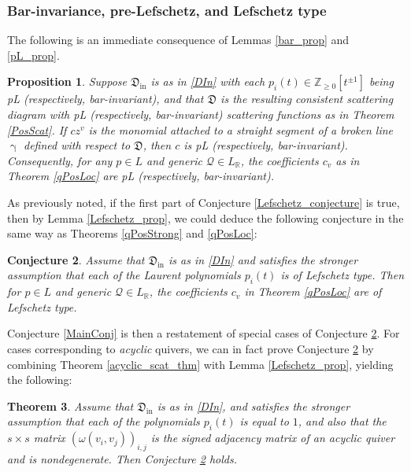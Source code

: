 \documentclass{amsart}
\DeclareMathOperator{\In}{in}
\let\bb=\mathbb
\let\f=\mathfrak
\newcommand {\sQ} {\mathcal{Q}}
\renewcommand{\gamma}{\upgamma}
\theoremstyle{plain}%
\newtheorem{thm}{Theorem}[section]
\newtheorem{prop}[thm]{Proposition}
\newtheorem{conj}[thm]{Conjecture}
\theoremstyle{definition}
\theoremstyle{remark}
\begin{document}
\subsubsection{Bar-invariance, pre-Lefschetz, and Lefschetz type}


The following is an immediate consequence of Lemmas \ref{bar_prop} and \ref{pL_prop}.
\begin{prop}\label{bar-pL}
Suppose $\f{D}_{\In}$ is as in \eqref{DIn} with each $p_i(t)\in \bb{Z}_{\geq 0}[t^{\pm 1}]$ being pL (respectively, bar-invariant), and that $\f{D}$ is the resulting consistent scattering diagram with pL (respectively, bar-invariant) scattering functions as in Theorem \ref{PosScat}.  If $cz^v$ is the monomial attached to a straight segment of a broken line $\gamma$ defined with respect to $\f{D}$, then $c$ is pL (respectively, bar-invariant).  Consequently, for any $p\in L$ and generic $\sQ\in L_{\bb{R}}$, the coefficients $c_v$ as in Theorem \ref{qPosLoc} are pL (respectively, bar-invariant).
\end{prop}


As previously noted, if the first part of Conjecture \ref{Lefschetz_conjecture} is true, then by Lemma \ref{Lefschetz_prop}, we could deduce the following conjecture in the same way as Theorems \ref{qPosStrong} and \ref{qPosLoc}:

\begin{conj}\label{LefschetzTheta}
Assume that $\f{D}_{\In}$ is as in \eqref{DIn} and satisfies the stronger assumption that each of the Laurent polynomials $p_i(t)$ is of Lefschetz type.  Then for $p\in L$ and generic $\sQ\in L_{\bb{R}}$, the coefficients $c_v$ in Theorem \ref{qPosLoc} are of Lefschetz type.
\end{conj}


Conjecture \ref{MainConj} is then a restatement of special cases of Conjecture \ref{LefschetzTheta}.  For cases corresponding to \textit{acyclic} quivers, we can in fact prove Conjecture \ref{LefschetzTheta} by combining Theorem \ref{acyclic_scat_thm} with Lemma \ref{Lefschetz_prop}, yielding the following:

\begin{thm}\label{AcyclicThetas}
Assume that $\f{D}_{\In}$ is as in \eqref{DIn}, and satisfies the stronger assumption that each of the polynomials $p_i(t)$ is equal to $1$, and also that the $s\times s$ matrix $(\omega(v_i,v_j))_{i,j}$ is the signed adjacency matrix of an acyclic quiver and is nondegenerate.  Then Conjecture \ref{LefschetzTheta} holds.
\end{thm}
\end{document}
